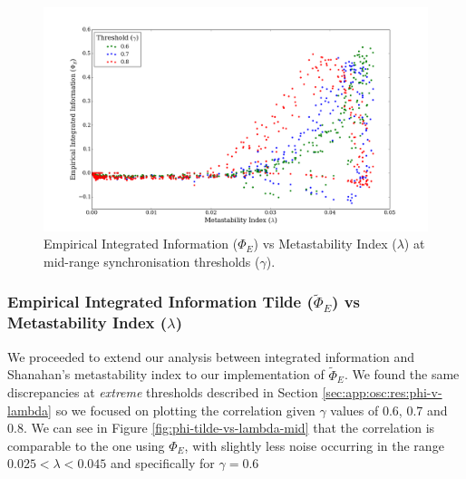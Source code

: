\documentclass[a4paper,11pt]{article}
\begin{document}
\begin{figure}[H]
\begin{center}
\includegraphics[scale = 0.35]{figures/phi_vs_lambda_mid}
\caption{
	Empirical Integrated Information ($\Phi_E$) vs Metastability Index ($\lambda$) at mid-range synchronisation thresholds ($\gamma$).
	\label{fig:phi-vs-lambda-mid}
}
\end{center}
\end{figure}

\subsubsection{Empirical Integrated Information Tilde ($\widetilde{\Phi}_{E}$) vs Metastability Index ($\lambda$)}
\label{sec:app:osc:res:phi-tilde-v-lambda}

We proceeded to extend our analysis between integrated information and Shanahan's metastability index to our implementation of $\widetilde{\Phi}_{E}$. We found the same discrepancies at \textit{extreme} thresholds described in Section \ref{sec:app:osc:res:phi-v-lambda} so we focused on plotting the correlation given $\gamma$ values of 0.6, 0.7 and 0.8. We can see in Figure \ref{fig:phi-tilde-vs-lambda-mid} that the correlation is comparable to the one using $\Phi_E$, with slightly less noise occurring in the range $0.025 < \lambda < 0.045$ and specifically for $\gamma = 0.6$
\end{document}
